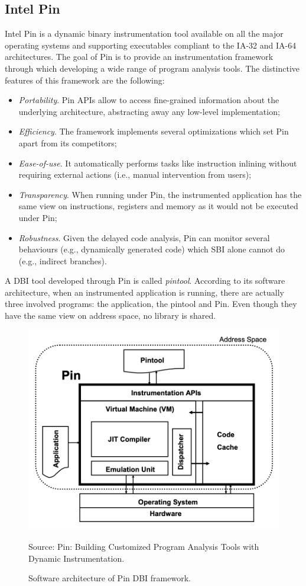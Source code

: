 \documentclass[LaM,binding=0.6cm]{sapthesis}
\newcommand{\source}[1]{\caption*{Source: {#1}} }
\begin{document}
\subsection{Intel Pin}
Intel Pin is a dynamic binary instrumentation tool available on all the major operating systems and supporting executables compliant to the IA-32 and IA-64 architectures. The goal of Pin is to provide an instrumentation framework through which developing a wide range of program analysis tools. The distinctive features of this framework are the following:
\begin{itemize}
\item \textit{Portability}. Pin APIs allow to access fine-grained information about the underlying architecture, abstracting away any low-level implementation;
\item \textit{Efficiency}. The framework implements several optimizations which set Pin apart from its competitors;
\item \textit{Ease-of-use}. It automatically performs tasks like instruction inlining without requiring external actions (i.e., manual intervention from users);
\item \textit{Transparency}. When running under Pin, the instrumented application has the same view on instructions, registers and memory as it would not be executed under Pin;
\item \textit{Robustness}. Given the delayed code analysis, Pin can monitor several behaviours (e.g., dynamically generated code) which SBI alone cannot do (e.g., indirect branches).
\end{itemize}
A DBI tool developed through Pin is called \textit{pintool}. According to its software architecture, when an instrumented application is running, there are actually three involved programs: the application, the pintool and Pin. Even though they have the same view on address space, no library is shared.

\begin{figure}[h!]
\centering
\includegraphics[scale=.7]{images/techn7}
\caption{Software architecture of Pin DBI framework.}
\source{Pin: Building Customized Program Analysis Tools with Dynamic Instrumentation.}
\end{figure}
\newpage
\end{document}
